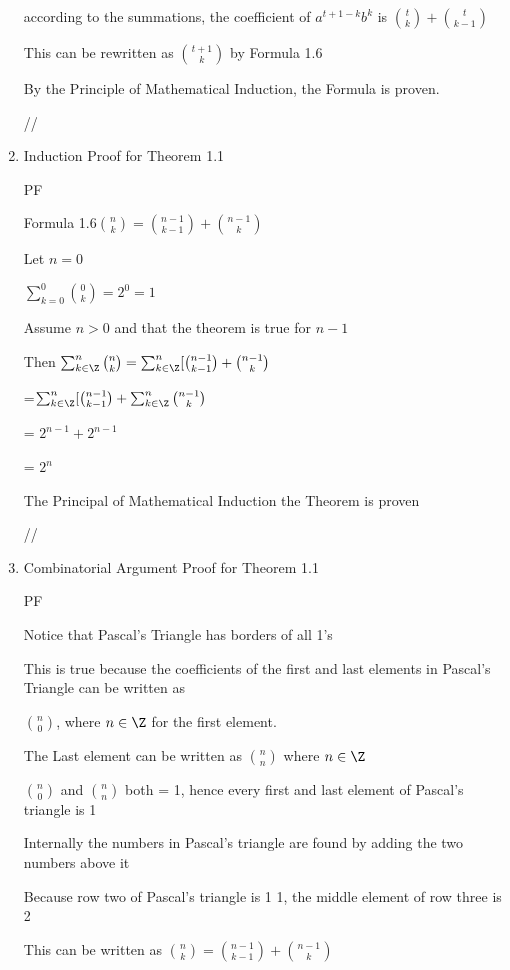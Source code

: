 \documentclass[12pt]{article}
\begin{document}
\begin{enumerate}
{according to the summations, the coefficient of $a^{t+1-k}b^k$  is  ${t \choose k} + {t \choose k-1}$

This can be rewritten as ${t + 1 \choose k}$ by Formula 1.6

By the Principle of Mathematical Induction, the Formula is proven.



//
}

\item Induction Proof for Theorem 1.1

{PF

Formula 1.6$ {n \choose k} = {n-1 \choose k-1} + {n-1 \choose k}$


Let $n=0$

$\sum_{k=0}^{0} {0 \choose k} = 2^0 = 1$

Assume $n>0$ and that the theorem is true for $n-1$

Then $\sum_{k \in \Z}^{n} {n \choose k} = \sum_{k \in \Z}^{n} [{n-1 \choose k-1} +{n-1 \choose k} $

=$ \sum_{k \in \Z}^{n} [{n-1 \choose k-1} + \sum_{k \in \Z}^{n} {n-1 \choose k} $

= $2^{n-1}+2^{n-1}$

= $2^n$

The Principal of Mathematical Induction the Theorem is proven

//

}

\item Combinatorial Argument Proof for Theorem 1.1

{PF

Notice that Pascal's Triangle has borders of all 1's

This is true because the coefficients of the first and last elements in Pascal's Triangle can be written as

${n \choose 0}$, where $n \in \Z$ for the first element.

The Last element can be written as ${n \choose n}$ where $n \in \Z$ 

${n \choose 0}$ and ${n \choose n}$ both = 1, hence every first and last element of Pascal's triangle is 1

Internally the numbers in Pascal's triangle are found by adding the two numbers above it

Because row two of Pascal's triangle is 1 1, the middle element of row three is 2

This can be written as ${n \choose k} = {n-1 \choose k-1} + {n-1 \choose k}$

}
\end{enumerate}
\end{document}
